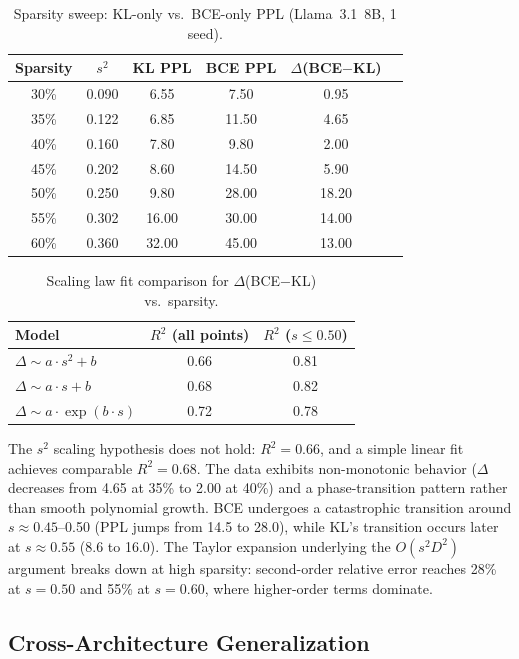 \documentclass[11pt]{article}
\begin{document}
\begin{table}[h]
\centering
\caption{Sparsity sweep: KL-only vs.\ BCE-only PPL (Llama~3.1~8B, 1 seed).}
\label{tab:sweep}
\small
\begin{tabular}{cccccc}
\toprule
Sparsity & $s^2$ & KL PPL & BCE PPL & $\Delta$(BCE$-$KL) \\
\midrule
30\% & 0.090 & 6.55 & 7.50 & 0.95 \\
35\% & 0.122 & 6.85 & 11.50 & 4.65 \\
40\% & 0.160 & 7.80 & 9.80 & 2.00 \\
45\% & 0.202 & 8.60 & 14.50 & 5.90 \\
50\% & 0.250 & 9.80 & 28.00 & 18.20 \\
55\% & 0.302 & 16.00 & 30.00 & 14.00 \\
60\% & 0.360 & 32.00 & 45.00 & 13.00 \\
\bottomrule
\end{tabular}
\end{table}

\begin{table}[h]
\centering
\caption{Scaling law fit comparison for $\Delta$(BCE$-$KL) vs.\ sparsity.}
\label{tab:scaling_fit}
\small
\begin{tabular}{lcc}
\toprule
Model & $R^2$ (all points) & $R^2$ ($s \leq 0.50$) \\
\midrule
$\Delta \sim a \cdot s^2 + b$ & 0.66 & 0.81 \\
$\Delta \sim a \cdot s + b$ & 0.68 & 0.82 \\
$\Delta \sim a \cdot \exp(b \cdot s)$ & 0.72 & 0.78 \\
\bottomrule
\end{tabular}
\end{table}

The $s^2$ scaling hypothesis does not hold: $R^2 = 0.66$, and a simple linear fit achieves comparable $R^2 = 0.68$.
The data exhibits non-monotonic behavior ($\Delta$ decreases from 4.65 at 35\% to 2.00 at 40\%) and a phase-transition pattern rather than smooth polynomial growth.
BCE undergoes a catastrophic transition around $s \approx 0.45$--0.50 (PPL jumps from 14.5 to 28.0), while KL's transition occurs later at $s \approx 0.55$ (8.6 to 16.0).
The Taylor expansion underlying the $O(s^2 D^2)$ argument breaks down at high sparsity: second-order relative error reaches 28\% at $s = 0.50$ and 55\% at $s = 0.60$, where higher-order terms dominate.

\subsection{Cross-Architecture Generalization}
\end{document}
